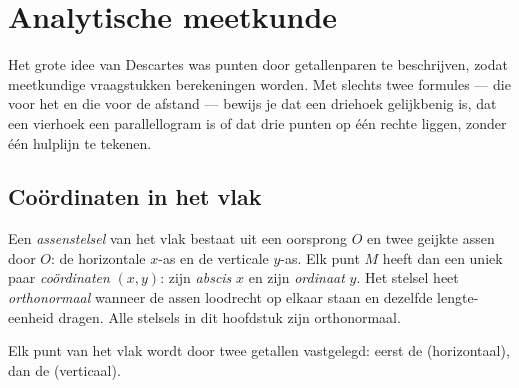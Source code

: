 \chapter{Analytische meetkunde}\label{ch:g10:coordgeom}

Het grote idee van Descartes was punten door getallenparen te beschrijven,
zodat meetkundige vraagstukken berekeningen worden. Met slechts twee formules
--- die voor het  en die voor de afstand --- bewijs je dat een driehoek
gelijkbenig is, dat een vierhoek een parallellogram is of dat drie punten op
één rechte liggen, zonder één hulplijn te tekenen.

\section{Coördinaten in het vlak}

\begin{definition}[Assenstelsel]\label{def:g10:coordgeom:system}
Een \emph{assenstelsel} van het vlak bestaat uit een
oorsprong $O$ en twee geijkte assen door $O$: de horizontale $x$-as en de
verticale $y$-as. Elk punt $M$ heeft dan een uniek paar
\emph{coördinaten} $(x, y)$: zijn
\emph{abscis} $x$ en zijn \emph{ordinaat} $y$.
Het stelsel heet \emph{orthonormaal} wanneer
de assen loodrecht op elkaar staan en dezelfde lengte-eenheid dragen. Alle
stelsels in dit hoofdstuk zijn orthonormaal.
\end{definition}

\begin{omfigure}

{\small Elk punt van het vlak wordt door twee getallen vastgelegd: eerst de
 (horizontaal), dan de  (verticaal).}
\end{omfigure}

